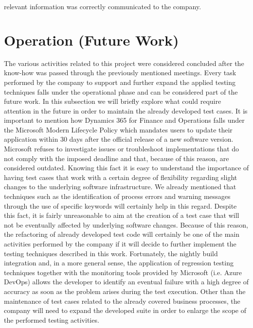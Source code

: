relevant information was correctly communicated to the company.

\section{Operation (Future Work)} 

The various activities related to this project were considered concluded after the know-how was passed through the previously mentioned meetings. Every task performed by the company to support and further expand the applied testing techniques falls under the operational phase and can be considered part of the future work. In this subsection we will briefly explore what could require attention in the future in order to maintain the already developed test cases. 
It is important to mention how Dynamics 365 for Finance and Operations falls under the Microsoft Modern Lifecycle Policy which mandates users to update their application within 30 days after the official release of a new software version. Microsoft refuses to investigate issues or troubleshoot implementations that do not comply with the imposed deadline and that, because of this reason, are considered outdated. Knowing this fact it is easy to understand the importance of having test cases that work with a certain degree of flexibility regarding slight changes to the underlying software infrastructure. We already mentioned that techniques such as the identification of process errors and warning messages through the use of specific keywords will certainly help in this regard. Despite this fact, it is fairly unreasonable to aim at the creation of a test case that will not be eventually affected by underlying software changes. Because of this reason, the refactoring of already developed test code will certainly be one of the main activities performed by the company if it will decide to further implement the testing techniques described in this work. Fortunately, the nightly build integration and, in a more general sense, the application of regression testing techniques together with the monitoring tools provided by Microsoft (i.e. Azure DevOps) allows the developer to identify an eventual failure with a high degree of accuracy as soon as the problem arises during the test execution. 
Other than the maintenance of test cases related to the already covered business processes, the company will need to expand the developed suite in order to enlarge the scope of the performed testing activities. 
